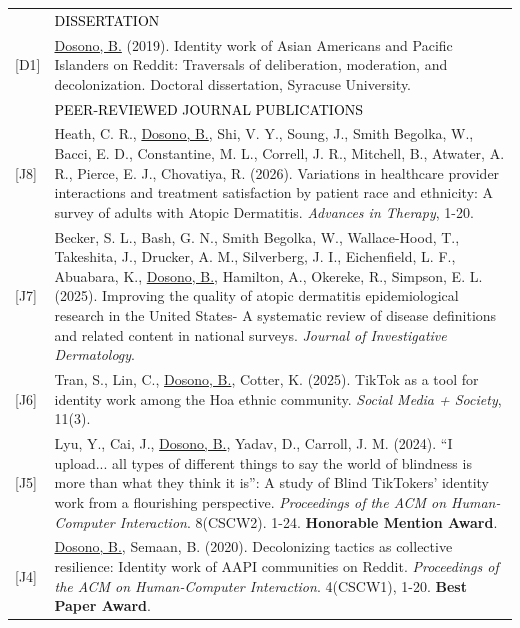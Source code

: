 \documentclass[12pt]{article}
\begin{document}
{\begin{longtable}{R{0.75in}p{5.0in}}
& \large \textcolor{black}{\uppercase{Dissertation}}\\

\footnotesize{[D1]} & \href{https://surface.syr.edu/etd/1034/}{Dosono, B.} (2019). Identity work of Asian Americans and Pacific Islanders on Reddit: Traversals of deliberation, moderation, and decolonization. Doctoral dissertation, Syracuse University. \medskip \\ \pagebreak

& \large \textcolor{black}{\uppercase{Peer-reviewed Journal Publications}}\\

\footnotesize{[J8]} & Heath, C. R., \href{https://doi.org/10.1007/s12325-026-03634-z}{Dosono, B.}, Shi, V. Y., Soung, J., Smith Begolka, W., Bacci, E. D., Constantine, M. L., Correll, J. R., Mitchell, B., Atwater, A. R., Pierce, E. J.,  Chovatiya, R. (2026). Variations in healthcare provider interactions and treatment satisfaction by patient race and ethnicity: A survey of adults with Atopic Dermatitis. \textit{Advances in Therapy}, 1-20.\\

\footnotesize{[J7]} & Becker, S. L., Bash, G. N., Smith Begolka, W., Wallace-Hood, T., Takeshita, J., Drucker, A. M., Silverberg, J. I., Eichenfield, L. F., Abuabara, K., \href{https://doi.org/10.1016/j.jid.2025.07.025}{Dosono, B.}, Hamilton, A., Okereke, R., Simpson, E. L. (2025). Improving the quality of atopic dermatitis epidemiological research in the United States- A systematic review of disease definitions and related content in national surveys. \textit{Journal of Investigative Dermatology}.\\

\footnotesize{[J6]} & Tran, S., Lin, C., \href{https://doi.org/10.1177/20563051251363215}{Dosono, B.}, Cotter, K. (2025). TikTok as a tool for identity work among the Hoa ethnic community. \textit{Social Media + Society}, 11(3).\\

\footnotesize{[J5]} & Lyu, Y., Cai, J., \href{https://dl.acm.org/doi/10.1145/3687013}{Dosono, B.}, Yadav, D., Carroll, J. M. (2024). ``I upload... all types of different things to say the world of blindness is more than what they think it is'': A study of Blind TikTokers' identity work from a flourishing perspective. \textit{Proceedings of the ACM on Human-Computer Interaction}. 8(CSCW2). 1-24. \textbf{Honorable Mention Award}.\\

\footnotesize{[J4]} & \href{https://dl.acm.org/doi/10.1145/3392881?cid=88158835957}{Dosono, B.}, Semaan, B. (2020). Decolonizing tactics as collective resilience: Identity work of AAPI communities on Reddit. \textit{Proceedings of the ACM on Human-Computer Interaction}. 4(CSCW1), 1-20. \textbf{Best Paper Award}.\\


\end{longtable}}
\end{document}
